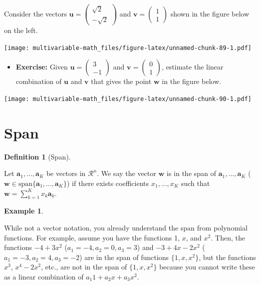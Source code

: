 \documentclass[
]{book}
\providecommand{\tightlist}{%
  \setlength{\itemsep}{0pt}\setlength{\parskip}{0pt}}
\theoremstyle{definition}
\newtheorem{definition}{Definition}[chapter]
\theoremstyle{definition}
\newtheorem{example}{Example}[chapter]
\theoremstyle{definition}
\theoremstyle{remark}
\begin{document}
Consider the vectors \(\mathbf{u} = \begin{pmatrix} \sqrt{2} \\ - \sqrt{2} \end{pmatrix}\) and \(\mathbf{v} = \begin{pmatrix} 1 \\ 1 \end{pmatrix}\) shown in the figure below on the left.

\texttt{[image: multivariable-math\_files/figure-latex/unnamed-chunk-89-1.pdf]}

\begin{itemize}
\tightlist
\item
  \textbf{Exercise:} Given \(\mathbf{u} = \begin{pmatrix} 3 \\ -1 \end{pmatrix}\) and \(\mathbf{v} = \begin{pmatrix} 0 \\ 1 \end{pmatrix}\), estimate the linear combination of \(\mathbf{u}\) and \(\mathbf{v}\) that gives the point \(\mathbf{w}\) in the figure below.
\end{itemize}

\texttt{[image: multivariable-math\_files/figure-latex/unnamed-chunk-90-1.pdf]}

\hypertarget{span}{%
\section{Span}\label{span}}

\begin{definition}[Span]
\protect\hypertarget{def:span}{}\label{def:span}

Let \(\mathbf{a}_1, \ldots, \mathbf{a}_K\) be vectors in \(\mathcal{R}^n\). We say the vector \(\mathbf{w}\) is in the span of \(\mathbf{a}_1, \ldots, \mathbf{a}_K\) (\(\mathbf{w} \in \mbox{span}\{ \mathbf{a}_1, \ldots, \mathbf{a}_K \}\)) if there exists coefficients \(x_1, \ldots, x_K\) such that \(\mathbf{w} = \sum_{k=1}^K x_k \mathbf{a}_k\).

\end{definition}

\begin{example}
\protect\hypertarget{exm:unlabeled-div-66}{}\label{exm:unlabeled-div-66}

While not a vector notation, you already understand the span from polynomial functions. For example, assume you have the functions 1, \(x\), and \(x^2\). Then, the functions \(-4 + 3x^2\) (\(a_1 = -4, a_2 = 0, a_3 = 3\)) and \(-3 + 4x - 2x^2\) (\(a_1 = -3, a_2 = 4, a_3 = -2\)) are in the span of functions \(\{1, x, x^2\}\), but the functions \(x^3\), \(x^4 - 2x^2\), etc., are not in the span of \(\{1, x, x^2\}\) because you cannot write these as a linear combination of \(a_1 1 + a_2 x + a_3 x^2\).

\end{example}
\end{document}
